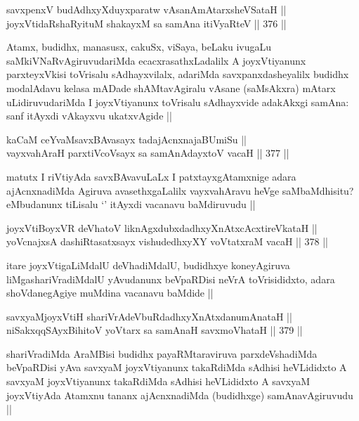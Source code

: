 
\begin{shl}
savxpenxV budAdhxyXduyxparatw vAsanAmAtarxsheVSataH ||  \\
joyxVtidaRshaRyituM shakayxM sa samAna itiVyaRteV ||  376 ||  
\end{shl}

\begin{artha}
Atamx, budidhx, manasusx, cakuSx, viSaya, beLaku ivugaLu saMkiVNaRvAgiruvudariMda ecacxrasathxLadalilx A joyxVtiyanunx parxteyxVkisi toVrisalu sAdhayxvilalx, adariMda savxpanxdasheyalilx budidhx modalAdavu kelasa mADade shAMtavAgiralu vAsane (saMsAkxra) mAtarx uLidiruvudariMda I joyxVtiyanunx toVrisalu sAdhayxvide adakAkxgi samAna: sanf itAyxdi vAkayxvu ukatxvAgide ||
\end{artha}

\begin{shl}
kaCaM ceYvaMsavxBAvasayx tadajAcnxnajaBUmiSu || \\
vayxvahAraH parxtiVcoV\s sayx sa samAnAdayxtoV vacaH ||  377 ||  
\end{shl}

\begin{artha}
matutx I riVtiyAda savxBAvavuLaLx I patxtayxgAtamxnige adara ajAcnxnadiMda Agiruva avasethxgaLalilx vayxvahAravu heVge saMbaMdhisitu? eMbudanunx tiLisalu `\stext' itAyxdi vacanavu baMdiruvudu ||
\end{artha}

\begin{shl}
joyxVtiBoyxVR deVhatoV liknAgxdubxdadhxyXnAtxcAcxtireVkataH || \\
yoV\s cnajxsA dashiRtasatxsayx vishudedhxyXY voVtatxraM vacaH ||  378 ||  
\end{shl}

\begin{artha}
itare joyxVtigaLiMdalU deVhadiMdalU, budidhxye koneyAgiruva liMgashariVradiMdalU yAvudanunx beVpaRDisi neVrA toVrisididxto, adara shoVdanegAgiye muMdina vacanavu baMdide ||
\end{artha}

\begin{shl}
savxyaMjoyxVtiH shariVrAdeVbuRdadhxyXnAtxdanumAnataH || \\
niSakxqqSAyxBihitoV yoV\s tarx sa samAnaH savxmoVhataH ||  379 ||  
\end{shl}

\begin{artha}
shariVradiMda AraMBisi budidhx payaRMtaraviruva parxdeVshadiMda beVpaRDisi yAva savxyaM joyxVtiyanunx takaRdiMda sAdhisi heVLididxto A savxyaM joyxVtiyanunx takaRdiMda sAdhisi heVLididxto A savxyaM joyxVtiyAda Atamxnu tananx ajAcnxnadiMda (budidhxge) samAnavAgiruvudu ||
\end{artha}

